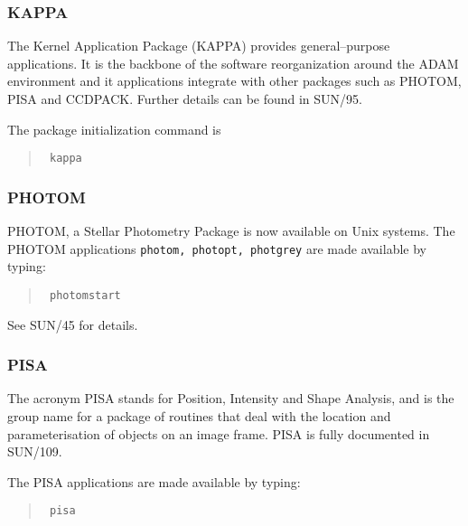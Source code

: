 \subsubsection{KAPPA}

The Kernel Application Package (KAPPA) provides general--purpose applications.
It is the backbone of the software reorganization around the ADAM environment
and it applications integrate with other packages such as PHOTOM, PISA and
CCDPACK.
Further details can be found in SUN/95.

The package initialization command is

\begin{quote}\tt
kappa
\end{quote}


\subsubsection{PHOTOM}

PHOTOM, a Stellar Photometry Package is now available on Unix systems.
The PHOTOM applications {\tt photom, photopt, photgrey} are made available
by typing:
\begin{quote}\tt
photomstart
\end{quote}
See SUN/45 for details.

\subsubsection{PISA}

The acronym PISA stands for Position, Intensity and Shape Analysis, and is
the group name for a package of routines that deal with the location and
parameterisation of objects on an image frame.
PISA is fully documented in SUN/109.

The PISA applications are made available
by typing:
\begin{quote}\tt
pisa
\end{quote}


